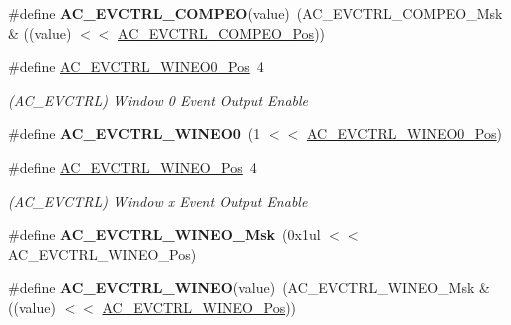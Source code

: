 \begin{DoxyCompactItemize}
\item 
\hypertarget{group___s_a_m_l21___a_c_ga8566809233283aa65406fdcbcb10c306}{}\#define {\bfseries A\+C\+\_\+\+E\+V\+C\+T\+R\+L\+\_\+\+C\+O\+M\+P\+E\+O}(value)~(A\+C\+\_\+\+E\+V\+C\+T\+R\+L\+\_\+\+C\+O\+M\+P\+E\+O\+\_\+\+Msk \& ((value) $<$$<$ \hyperlink{group___s_a_m_l21___a_c_ga9a60df9204a6150ee4ce9fc489666d9d}{A\+C\+\_\+\+E\+V\+C\+T\+R\+L\+\_\+\+C\+O\+M\+P\+E\+O\+\_\+\+Pos}))\label{group___s_a_m_l21___a_c_ga8566809233283aa65406fdcbcb10c306}

\item 
\hypertarget{group___s_a_m_l21___a_c_ga0e39ab9106d32a5826c0b03c25f0f010}{}\#define \hyperlink{group___s_a_m_l21___a_c_ga0e39ab9106d32a5826c0b03c25f0f010}{A\+C\+\_\+\+E\+V\+C\+T\+R\+L\+\_\+\+W\+I\+N\+E\+O0\+\_\+\+Pos}~4\label{group___s_a_m_l21___a_c_ga0e39ab9106d32a5826c0b03c25f0f010}

\begin{DoxyCompactList}\small\item\em (A\+C\+\_\+\+E\+V\+C\+T\+R\+L) Window 0 Event Output Enable \end{DoxyCompactList}\item 
\hypertarget{group___s_a_m_l21___a_c_ga122e442c93867ad67c16f2bbc35e11b6}{}\#define {\bfseries A\+C\+\_\+\+E\+V\+C\+T\+R\+L\+\_\+\+W\+I\+N\+E\+O0}~(1 $<$$<$ \hyperlink{group___s_a_m_l21___a_c_ga0e39ab9106d32a5826c0b03c25f0f010}{A\+C\+\_\+\+E\+V\+C\+T\+R\+L\+\_\+\+W\+I\+N\+E\+O0\+\_\+\+Pos})\label{group___s_a_m_l21___a_c_ga122e442c93867ad67c16f2bbc35e11b6}

\item 
\hypertarget{group___s_a_m_l21___a_c_ga1afab4ba445e18743d95471ac63fc5f3}{}\#define \hyperlink{group___s_a_m_l21___a_c_ga1afab4ba445e18743d95471ac63fc5f3}{A\+C\+\_\+\+E\+V\+C\+T\+R\+L\+\_\+\+W\+I\+N\+E\+O\+\_\+\+Pos}~4\label{group___s_a_m_l21___a_c_ga1afab4ba445e18743d95471ac63fc5f3}

\begin{DoxyCompactList}\small\item\em (A\+C\+\_\+\+E\+V\+C\+T\+R\+L) Window x Event Output Enable \end{DoxyCompactList}\item 
\hypertarget{group___s_a_m_l21___a_c_gacaf33f5e882907efaa5d1796b80c8eb8}{}\#define {\bfseries A\+C\+\_\+\+E\+V\+C\+T\+R\+L\+\_\+\+W\+I\+N\+E\+O\+\_\+\+Msk}~(0x1ul $<$$<$ A\+C\+\_\+\+E\+V\+C\+T\+R\+L\+\_\+\+W\+I\+N\+E\+O\+\_\+\+Pos)\label{group___s_a_m_l21___a_c_gacaf33f5e882907efaa5d1796b80c8eb8}

\item 
\hypertarget{group___s_a_m_l21___a_c_gaa9bf3767e1890a5777a9299e4fc7e812}{}\#define {\bfseries A\+C\+\_\+\+E\+V\+C\+T\+R\+L\+\_\+\+W\+I\+N\+E\+O}(value)~(A\+C\+\_\+\+E\+V\+C\+T\+R\+L\+\_\+\+W\+I\+N\+E\+O\+\_\+\+Msk \& ((value) $<$$<$ \hyperlink{group___s_a_m_l21___a_c_ga1afab4ba445e18743d95471ac63fc5f3}{A\+C\+\_\+\+E\+V\+C\+T\+R\+L\+\_\+\+W\+I\+N\+E\+O\+\_\+\+Pos}))\label{group___s_a_m_l21___a_c_gaa9bf3767e1890a5777a9299e4fc7e812}


\end{DoxyCompactItemize}
